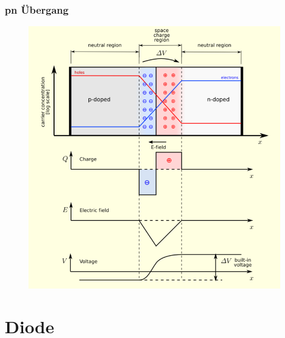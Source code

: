 \begin{frame}
    \frametitle{pn Übergang}
    \begin{center}
    \begin{figure}
        \includegraphics[width=\textwidth,height=.8\textheight, keepaspectratio]{e12/pn-Diagram.png}
    \end{figure}
	\end{center}
\end{frame}

\section*{Diode}

